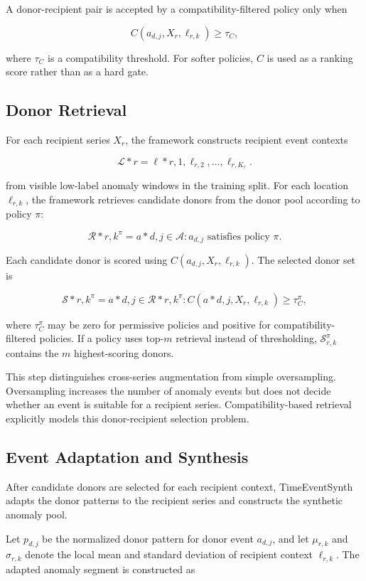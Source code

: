 \documentclass[conference]{IEEEtran}
\begin{document}
A donor-recipient pair is accepted by a compatibility-filtered policy only when

\[
C(a_{d,j},X_r,\ell_{r,k}) \geq \tau_C,
\]

where $\tau_C$ is a compatibility threshold. For softer policies, $C$ is used as a ranking score rather than as a hard gate.


\subsection{Donor Retrieval}

For each recipient series $X_r$, the framework constructs recipient event contexts

\[
\mathcal{L}*r={\ell*{r,1},\ell_{r,2},\ldots,\ell_{r,K_r}}.
\]

from visible low-label anomaly windows in the training split. For each location $\ell_{r,k}$, the framework retrieves candidate donors from the donor pool according to policy $\pi$:

\[
\mathcal{R}*{r,k}^{\pi}
=
{a*{d,j}\in\mathcal{A}: a_{d,j} \text{ satisfies policy } \pi}.
\]

Each candidate donor is scored using $C(a_{d,j},X_r,\ell_{r,k})$. The selected donor set is

\[
\mathcal{S}*{r,k}^{\pi}
=
{a*{d,j}\in\mathcal{R}*{r,k}^{\pi}:
C(a*{d,j},X_r,\ell_{r,k})\geq \tau_C^{\pi}},
\]

where $\tau_C^{\pi}$ may be zero for permissive policies and positive for compatibility-filtered policies. If a policy uses top-$m$ retrieval instead of thresholding, $\mathcal{S}_{r,k}^{\pi}$ contains the $m$ highest-scoring donors.

This step distinguishes cross-series augmentation from simple oversampling. Oversampling increases the number of anomaly events but does not decide whether an event is suitable for a recipient series. Compatibility-based retrieval explicitly models this donor-recipient selection problem.
\subsection{Event Adaptation and Synthesis}

After candidate donors are selected for each recipient context, TimeEventSynth
adapts the donor patterns to the recipient series and constructs the synthetic
anomaly pool.

Let $p_{d,j}$ be the normalized donor pattern for donor event $a_{d,j}$, and
let $\mu_{r,k}$ and $\sigma_{r,k}$ denote the local mean and standard deviation
of recipient context $\ell_{r,k}$. The adapted anomaly segment is constructed as
\end{document}
